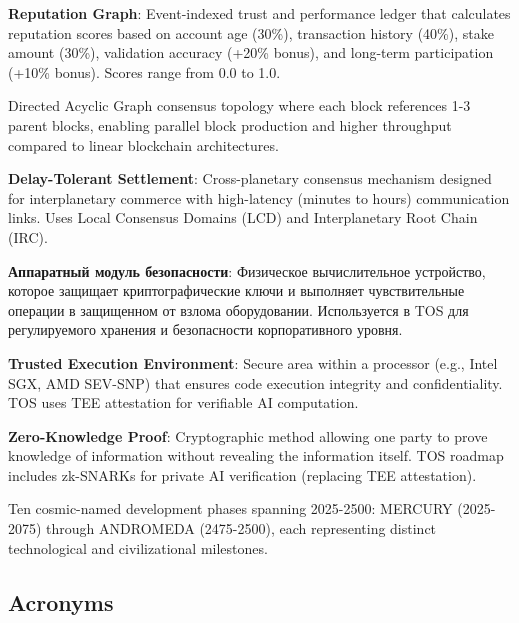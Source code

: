 \documentclass[11pt]{article}
\begin{document}
\begin{description}[leftmargin=3cm, style=nextline]
  \item[RepGraph] \textbf{Reputation Graph}: Event-indexed trust and performance ledger that calculates reputation scores based on account age (30\%), transaction history (40\%), stake amount (30\%), validation accuracy (+20\% bonus), and long-term participation (+10\% bonus). Scores range from 0.0 to 1.0.

  \item[BlockDAG] Directed Acyclic Graph consensus topology where each block references 1-3 parent blocks, enabling parallel block production and higher throughput compared to linear blockchain architectures.

  \item[DT-Settlement] \textbf{Delay-Tolerant Settlement}: Cross-planetary consensus mechanism designed for interplanetary commerce with high-latency (minutes to hours) communication links. Uses Local Consensus Domains (LCD) and Interplanetary Root Chain (IRC).

  \item[HSM] \textbf{Аппаратный модуль безопасности}: Физическое вычислительное устройство, которое защищает криптографические ключи и выполняет чувствительные операции в защищенном от взлома оборудовании. Используется в TOS для регулируемого хранения и безопасности корпоративного уровня.

  \item[TEE] \textbf{Trusted Execution Environment}: Secure area within a processor (e.g., Intel SGX, AMD SEV-SNP) that ensures code execution integrity and confidentiality. TOS uses TEE attestation for verifiable AI computation.

  \item[ZK Proof] \textbf{Zero-Knowledge Proof}: Cryptographic method allowing one party to prove knowledge of information without revealing the information itself. TOS roadmap includes zk-SNARKs for private AI verification (replacing TEE attestation).

  \item[Celestial Eras] Ten cosmic-named development phases spanning 2025-2500: MERCURY (2025-2075) through ANDROMEDA (2475-2500), each representing distinct technological and civilizational milestones.
\end{description}

\subsection*{Acronyms}
\end{document}
